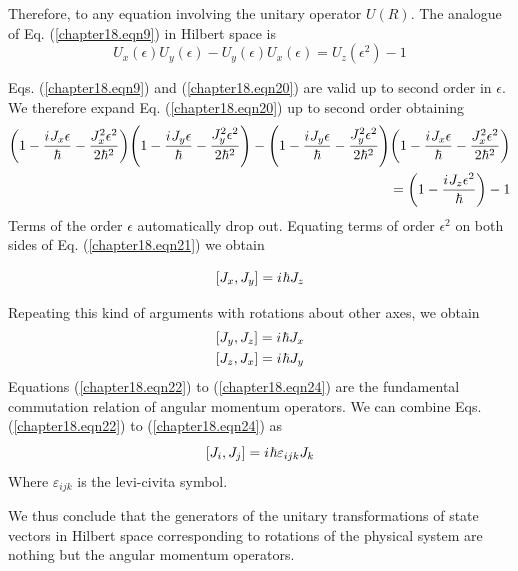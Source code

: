 Therefore, to any equation involving the unitary operator $U(R)$. The analogue of Eq. (\ref{chapter18.eqn9}) in Hilbert space is
\begin{equation}
\label{chapter18.eqn20}
U_x(\epsilon) U_y(\epsilon) - U_y(\epsilon) U_x(\epsilon) = U_z(\epsilon^2) - 1
\end{equation}

Eqs. (\ref{chapter18.eqn9}) and (\ref{chapter18.eqn20}) are valid up to second order in $\epsilon$. We therefore expand Eq. (\ref{chapter18.eqn20}) up to second order obtaining
\begin{equation}
\label{chapter18.eqn21}
\begin{split}
\qty(1 - \frac{{i\mkern1mu} J_x \epsilon}{\hbar} - \frac{J_x^2 \epsilon^2}{2 \hbar^2}) 
\qty(1 - \frac{{i\mkern1mu} J_y \epsilon}{\hbar} - \frac{J_y^2 \epsilon^2}{2 \hbar^2})
-
\qty(1 - \frac{{i\mkern1mu} J_y \epsilon}{\hbar} - \frac{J_y^2 \epsilon^2}{2 \hbar^2})
\qty(1 - \frac{{i\mkern1mu} J_x \epsilon}{\hbar} - \frac{J_x^2 \epsilon^2}{2 \hbar^2})\\
= \qty(1 - \frac{{i\mkern1mu} J_z \epsilon^2}{\hbar}) - 1
\end{split}
\end{equation}
Terms of the order $\epsilon$ automatically drop out. Equating terms of order  $\epsilon^2$ on both sides of Eq. (\ref{chapter18.eqn21}) we obtain

\begin{equation}
\label{chapter18.eqn22}
\comm{J_x}{J_y} = \iu \hbar J_z
\end{equation}

Repeating this kind of arguments with rotations about other axes, we obtain
\begin{align}
\label{chapter18.eqn23}
\comm{J_y}{J_z} = \iu \hbar J_x \\
\label{chapter18.eqn24}
\comm{J_z}{J_x} = \iu \hbar J_y
\end{align}
Equations (\ref{chapter18.eqn22}) to (\ref{chapter18.eqn24}) are the fundamental commutation relation of angular momentum operators.
We can combine Eqs. (\ref{chapter18.eqn22}) to (\ref{chapter18.eqn24}) as
\begin{equation}
	\comm{J_i}{J_j} = \iu \hbar \varepsilon_{i j k} J_k
\end{equation}
Where $\varepsilon_{i j k}$ is the levi-civita symbol.


 We thus conclude that the generators of the unitary transformations of state vectors in Hilbert space corresponding to rotations of the physical system are nothing but the angular momentum operators.



